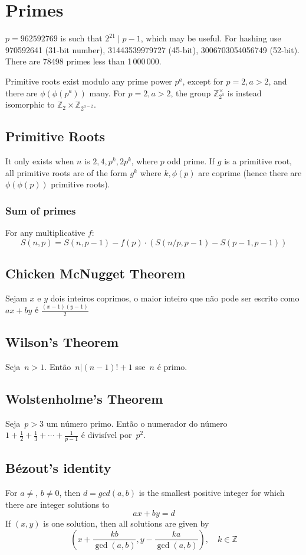 \section{Primes}
	$p=962592769$ is such that $2^{21} \mid p-1$, which may be useful. For hashing
	use 970592641 (31-bit number), 31443539979727 (45-bit), 3006703054056749
	(52-bit). There are 78498 primes less than 1\,000\,000.

	Primitive roots exist modulo any prime power $p^a$, except for $p = 2, a > 2$, and there are $\phi(\phi(p^a))$ many.
	For $p = 2, a > 2$, the group $\mathbb Z_{2^a}^\times$ is instead isomorphic to $\mathbb Z_2 \times \mathbb Z_{2^{a-2}}$.

\subsection{Primitive Roots}
	It only exists when $n$ is $2, 4, p^k, 2p^k$, where $p$ odd prime.
	If $g$ is a primitive root, all primitive roots are of the form $g^k$
	where $k,\phi(p)$ are coprime (hence there are $\phi(\phi(p))$ primitive roots).
	
\subsubsection{Sum of primes} For any multiplicative $f$:
                \[
                    S(n,p) = S(n, p-1) - f(p) \cdot (S(n/p,p-1) - S(p-1,p-1))
                \]

\subsection{Chicken McNugget Theorem}
	Sejam $x$ e $y$ dois inteiros coprimos, o maior inteiro que não pode ser escrito como $ax + by$ é $\frac{(x-1)(y-1)}{2}$

    \subsection{Wilson's Theorem}
Seja~$n > 1$. Então~$n|(n-1)!+1$ sse~$n$ é primo. \newline
\subsection{Wolstenholme's Theorem}
Seja~$p > 3$ um número primo. Então o numerador do número 
$ 1 + \frac{1}{2}+\frac{1}{3}+\cdots+\frac{1}{p-1} $
é divisível por~$p^2$. \newline
\subsection{Bézout's identity}
For $a \neq $, $b \neq 0$, then $d=gcd(a,b)$ is the smallest positive integer for which there are integer solutions to
$$ax+by=d$$
If $(x,y)$ is one solution, then all solutions are given by
$$\left(x+\frac{kb}{\gcd(a,b)}, y-\frac{ka}{\gcd(a,b)}\right), \quad k\in\mathbb{Z}$$\newline
